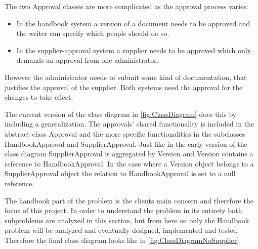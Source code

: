 The two Approval classes are more complicated as the approval process varies:

\begin{itemize}
  \item In the handbook system a version of a document needs to be approved and the writer can specify which people should do so.
  \item In the supplier-approval system a supplier needs to be approved which only demands an approval from one administrator. 
\end{itemize}

However the administrator needs to submit some kind of documentation, that justifies the approval of the supplier.
Both systems need the approval for the changes to take effect.

The current version of the class diagram in \cref{fig:ClassDiagram} does this by including a generalization. The approvals' shared functionality is included in the abstract class Approval and the more specific functionalities in the subclasses HandbookApproval and SupplierApproval.
Just like in the early version of the class diagram SupplierApproval is aggregated by Version and Version contains a reference to HandbookApproval.
In the case where a Version object belongs to a SupplierApproval object the relation to HandbookApproval is set to a null reference.

The handbook part of the problem is the clients main concern and therefore the focus of this project.
In order to understand the problem in its entirety both subproblems are analyzed in this section, but from here on  only the Handbook problem will be analyzed and eventually designed, implemented and tested.
Therefore the final class diagram looks like in \cref{fig:ClassDiagramNoSupplier}.

